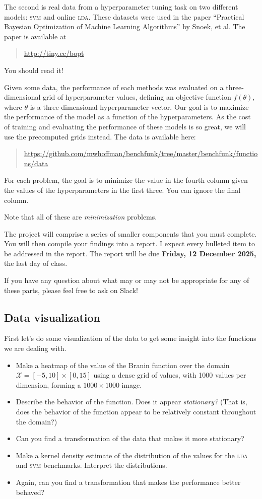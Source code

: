 \documentclass{article}
\newcommand{\acro}[1]{\textsc{\MakeLowercase{#1}}}
\newcommand{\mc}[1]{\mathcal{#1}}
\begin{document}
The second is real data from a hyperparameter tuning task on two different
models: \acro{SVM} and online \acro{LDA}. These datasets were used in the paper
``Practical Bayesian Optimization of Machine Learning Algorithms'' by Snoek, et
al. The paper is available at
\begin{quote}
  \url{http://tiny.cc/bopt}
\end{quote}
You should read it!

Given some data, the performance of each methods was evaluated on a
three-dimensional grid of hyperparameter values, defining an objective function
$f(\theta)$, where $\theta$ is a three-dimensional hyperparameter vector. Our
goal is to maximize the performance of the model as a function of the
hyperparameters.  As the cost of training and evaluating the performance of
these models is so great, we will use the precomputed grids instead. The data is
available here:
\begin{quote}
  \url{https://github.com/mwhoffman/benchfunk/tree/master/benchfunk/functions/data}
\end{quote}
For each problem, the goal is to minimize the value in the fourth column given
the values of the hyperparameters in the first three. You can ignore the final
column.

Note that all of these are \emph{minimization} problems.

The project will comprise a series of smaller components that you must
complete. You will then compile your findings into a report. I expect every
bulleted item to be addressed in the report. The report will be due
\textbf{Friday, 12 December 2025,} the last day of class.

If you have any question about what may or may not be appropriate for any of
these parts, please feel free to ask on Slack!

\subsection*{Data visualization}

First let's do some visualization of the data to get some insight into the
functions we are dealing with.

\begin{itemize}
\item
  Make a heatmap of the value of the Branin function over the domain $\mc{X} =
  [-5, 10] \times [0, 15]$ using a dense grid of values, with 1000 values per
  dimension, forming a $1000 \times 1000$ image.
\item
  Describe the behavior of the function. Does it appear \emph{stationary?} (That
  is, does the behavior of the function appear to be relatively constant
  throughout the domain?)
\item Can you find a transformation of the data that makes it more stationary?
\item
  Make a kernel density estimate of the distribution of the values for the
  \acro{LDA} and \acro{SVM} benchmarks. Interpret the distributions.
\item
  Again, can you find a transformation that makes the performance better
  behaved?
\end{itemize}
\end{document}
